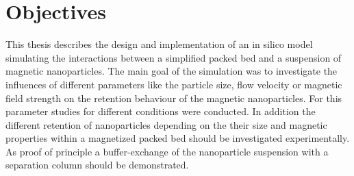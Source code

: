 \section{Objectives}
\label{sec:Objectives}

This thesis describes the design and implementation of an in silico model simulating the interactions between a simplified packed bed and a suspension of magnetic nanoparticles. The main goal of the simulation was to investigate the influences of different parameters like the particle size, flow velocity or magnetic field strength on the retention behaviour of the magnetic nanoparticles. For this parameter studies for different conditions were conducted. In addition the different retention of nanoparticles depending on the their size and magnetic properties within a magnetized packed bed should be investigated experimentally. As proof of principle a buffer-exchange of the nanoparticle suspension with a separation column should be demonstrated. 

